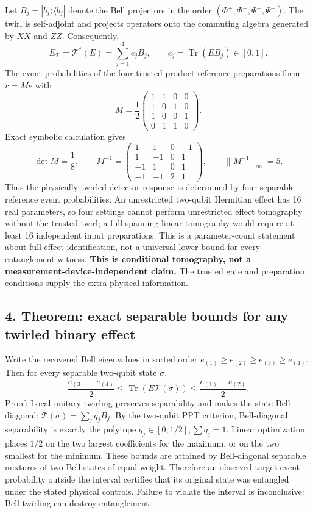 \documentclass[
  10pt,
  a4paper,
]{article}
\begin{document}
Let \(B_j=|b_j\rangle\langle b_j|\) denote the Bell projectors in the order \((\Phi^+,\Phi^-,\Psi^+,\Psi^-)\). The twirl is self-adjoint and projects operators onto the commuting algebra generated by \(XX\) and \(ZZ\). Consequently, \[
 E_{\mathcal T}=\mathcal T^*(E)=\sum_{j=1}^4 e_jB_j,\qquad e_j=\operatorname{Tr}(E B_j)\in[0,1].
\] The event probabilities of the four trusted product reference preparations form \(r=Me\) with \[
 M=\frac12\begin{pmatrix}1&1&0&0\\1&0&1&0\\1&0&0&1\\0&1&1&0\end{pmatrix}.
\] Exact symbolic calculation gives \[
 \det M=\frac18,\qquad
 M^{-1}=\begin{pmatrix}
 1&1&0&-1\\1&-1&0&1\\-1&1&0&1\\-1&-1&2&1
 \end{pmatrix},\qquad \|M^{-1}\|_{\infty}=5.
\] Thus the physically twirled detector response is determined by four separable reference event probabilities. An unrestricted two-qubit Hermitian effect has 16 real parameters, so four settings cannot perform unrestricted effect tomography without the trusted twirl; a full spanning linear tomography would require at least 16 independent input preparations. This is a parameter-count statement about full effect identification, not a universal lower bound for every entanglement witness. \textbf{This is conditional tomography, not a measurement-device-independent claim.} The trusted gate and preparation conditions supply the extra physical information.

\subsection{4. Theorem: exact separable bounds for any twirled binary effect}\label{theorem-exact-separable-bounds-for-any-twirled-binary-effect}

Write the recovered Bell eigenvalues in sorted order \(e_{(1)}\ge e_{(2)}\ge e_{(3)}\ge e_{(4)}\). Then for every separable two-qubit state \(\sigma\), \[
 \boxed{\frac{e_{(3)}+e_{(4)}}2\le \operatorname{Tr}(E\mathcal T(\sigma))\le\frac{e_{(1)}+e_{(2)}}2.}
\] Proof: Local-unitary twirling preserves separability and makes the state Bell diagonal: \(\mathcal T(\sigma)=\sum_jq_jB_j\). By the two-qubit PPT criterion, Bell-diagonal separability is exactly the polytope \(q_j\in[0,1/2],\sum q_j=1\). Linear optimization places \(1/2\) on the two largest coefficients for the maximum, or on the two smallest for the minimum. These bounds are attained by Bell-diagonal separable mixtures of two Bell states of equal weight. Therefore an observed target event probability outside the interval certifies that its original state was entangled under the stated physical controls. Failure to violate the interval is inconclusive: Bell twirling can destroy entanglement.
\end{document}
